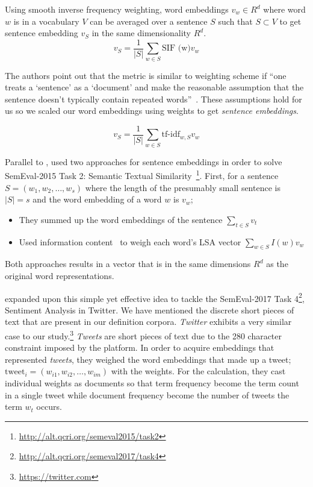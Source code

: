 Using smooth inverse frequency weighting, word embeddings $v_w \in R^{d}$ where word $w$ is in a vocabulary $V$ can be averaged over a sentence $S$ such that $S \subset V$ to get sentence embedding $v_S$ in the same dimensionality $R^{d}$.
\begin{equation}
    v_S = \frac{1}{|S|}\sum_{w \in S}\text{SIF (w)}v_{w}
\end{equation}

The authors point out that the metric is similar to \tfidf{} weighting scheme if \enquote{one treats a \enquote{sentence} as a \enquote{document} and make the reasonable assumption that the sentence doesn't typically contain repeated words}~\cite{aroraSimple2016}.
These assumptions hold for us so we scaled our word embeddings using \tfidf{} weights to get \emph{sentence embeddings}.

\begin{equation}
    v_S = \frac{1}{|S|}\sum_{w \in S}\text{tf-idf}_{w,S} v_w
\end{equation}

Parallel to \citeauthor{aroraSimple2016}, \textcite{zhao_ecnu_2015} used two approaches for sentence embeddings in order to solve SemEval-2015 Task 2: Semantic Textual Similarity~\footnote{\url{http://alt.qcri.org/semeval2015/task2}}.
First, for a sentence $S = (w_{1}, w_{2}, \dots, w_{s})$ where the length of the presumably small sentence is $|S| = s$ and the word embedding of a word $w$ is $v_w$;
\begin{itemize}
    \item They summed up the word embeddings of the sentence $\sum_{t \in S}v_{t}$
    \item Used information content~\cite{saric_takelab_2012} to weigh each word's LSA vector $\sum_{w \in S} I(w) v_{w}$
\end{itemize}
Both approaches results in a vector that is in the same dimensions $R^{d}$ as the original word representations.

\textcite{edilson_a._correa_nilc-usp_2017} expanded upon this simple yet effective idea to tackle the SemEval-2017 Task 4\footnote{\url{http://alt.qcri.org/semeval2017/task4}}, Sentiment Analysis in Twitter.
We have mentioned the discrete short pieces of text that are present in our definition corpora.
\emph{Twitter} exhibits a very similar case to our study.\footnote{\url{https://twitter.com}}
\emph{Tweets} are short pieces of text due to the 280 character constraint imposed by the platform.
In order to acquire embeddings that represented \emph{tweets}, they weighed the word embeddings that made up a tweet; $\text{tweet}_i = (w_{i1}, w_{i2}, \dots, w_{im})$ with the \tfidf{} weights.
For the \tfidf{} calculation, they cast individual weights as documents so that term frequency become the term count in a single tweet while document frequency become the number of tweets the term $w_t$ occurs.

